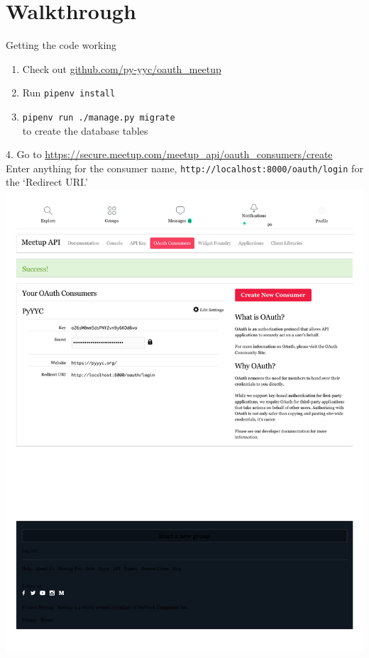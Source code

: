 \documentclass[xcolor=svgnames,17pt]{beamer}
\begin{document}
\section{Walkthrough}

\begin{frame}
\tableofcontents[currentsection]
\end{frame}

\begin{frame}{Getting the code working}
\begin{enumerate}
\item Check out
\href{https://github.com/py-yyc/oauth_meetup}{github.com/py-yyc/oauth\_meetup}

\item Run \texttt{pipenv install}

\item \texttt{pipenv run ./manage.py migrate} \\
to create the database tables
\end{enumerate}
\end{frame}

\begin{frame}[plain]
4. Go to \url{https://secure.meetup.com/meetup_api/oauth_consumers/create}
\\ Enter anything for the consumer name,
\texttt{http://localhost:8000/oauth/login} for the ‘Redirect URI.’
\includegraphics[width=0.5\paperwidth,center]{meetup-oauth-consumers.pdf}
\end{frame}
\end{document}
